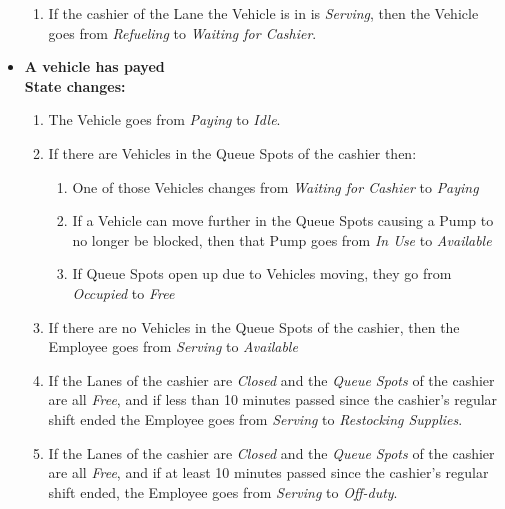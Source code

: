 \begin{itemize}
\begin{enumerate}
\item If the cashier of the Lane the Vehicle is in is \textit{Serving}, then the Vehicle goes from \textit{Refueling} to \textit{Waiting for Cashier}.
\end{enumerate}
\item \textbf{A vehicle has payed}\\
\textbf{State changes:}
\begin{enumerate}
\item The Vehicle goes from \textit{Paying} to \textit{Idle}.
\item If there are Vehicles in the Queue Spots of the cashier then:
\begin{enumerate}
\item One of those Vehicles changes from \textit{Waiting for Cashier} to \textit{Paying}
\item If a Vehicle can move further in the Queue Spots causing a Pump to no longer be blocked, then that Pump goes from \textit{In Use} to \textit{Available}
\item If Queue Spots open up due to Vehicles moving, they go from \textit{Occupied} to \textit{Free}
\end{enumerate}
\item If there are no Vehicles in the Queue Spots of the cashier, then the Employee goes from \textit{Serving} to \textit{Available}
\item If the Lanes of the cashier are \textit{Closed} and the \textit{Queue Spots} of the cashier are all \textit{Free}, and if less than 10 minutes passed since the cashier's regular shift ended the Employee goes from \textit{Serving} to \textit{Restocking Supplies}. 
\item If the Lanes of the cashier are \textit{Closed} and the \textit{Queue Spots} of the cashier are all \textit{Free}, and if at least 10 minutes passed since the cashier's regular shift ended, the Employee goes from \textit{Serving} to \textit{Off-duty}. 
\end{enumerate}
\end{itemize}

